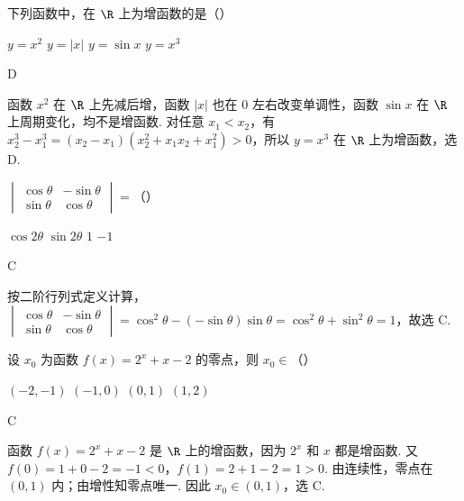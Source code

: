 \begin{problem}
下列函数中，在 \( \R \) 上为增函数的是（\quad）

\choices
    {\( y = x^{2} \)}
    {\( y = |x| \)}
    {\( y = \sin x \)}
    {\( y = x^{3} \)}
\end{problem}

\begin{answer}
D
\end{answer}

\begin{solution}
函数 \(x^2\) 在 \(\R\) 上先减后增，函数 \(|x|\) 也在 \(0\) 左右改变单调性，函数 \(\sin x\) 在 \(\R\) 上周期变化，均不是增函数. 对任意 \(x_1<x_2\)，有 \(x_2^3-x_1^3=(x_2-x_1)(x_2^2+x_1x_2+x_1^2)>0\)，所以 \(y=x^3\) 在 \(\R\) 上为增函数，选 D.
\end{solution}

\begin{problem}
\(\begin{vmatrix}\cos\theta & -\sin\theta \\ \sin\theta & \cos\theta\end{vmatrix} =\)（\quad）

\choices
    {\( \cos 2\theta \)}
    {\( \sin 2\theta \)}
    {\(1\)}
    {\(-1\)}
\end{problem}

\begin{answer}
C
\end{answer}

\begin{solution}
按二阶行列式定义计算，\(\begin{vmatrix}\cos\theta & -\sin\theta \\ \sin\theta & \cos\theta\end{vmatrix}=\cos^2\theta-(-\sin\theta)\sin\theta=\cos^2\theta+\sin^2\theta=1\)，故选 C.
\end{solution}

\begin{problem}
设 \( x_{0} \) 为函数 \( f(x)=2^{x}+x-2 \) 的零点，则 \( x_{0}\in \)（\quad）

\choices
    {\( (-2,-1) \)}
    {\( (-1,0) \)}
    {\( (0,1) \)}
    {\( (1,2) \)}
\end{problem}

\begin{answer}
C
\end{answer}

\begin{solution}
函数 \(f(x)=2^x+x-2\) 是 \(\R\) 上的增函数，因为 \(2^x\) 和 \(x\) 都是增函数. 又 \(f(0)=1+0-2=-1<0\)，\(f(1)=2+1-2=1>0\). 由连续性，零点在 \((0,1)\) 内；由增性知零点唯一. 因此 \(x_0\in(0,1)\)，选 C.
\end{solution}

